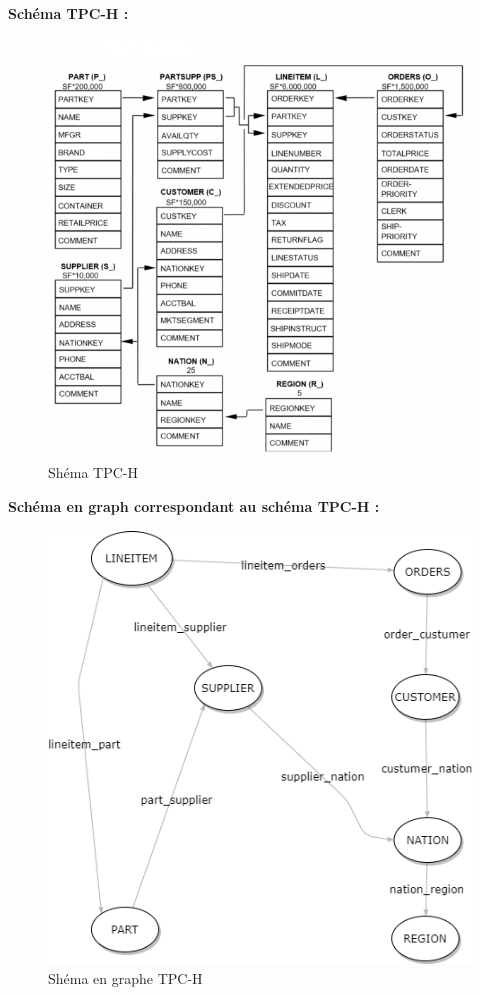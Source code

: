 \textbf{Schéma TPC-H :}
\begin{figure}[H]  
  \centering
    \includegraphics[width=1\textwidth]{chapitre5/Figures/shema_tpch.png}
  \caption{Shéma TPC-H}
\end{figure}

\textbf{Schéma en graph correspondant au schéma TPC-H :}
\begin{figure}[H]  
  \centering
    \includegraphics[width=1\textwidth]{chapitre5/Figures/shema_graph.png}
  \caption{Shéma en graphe TPC-H}
\end{figure}

